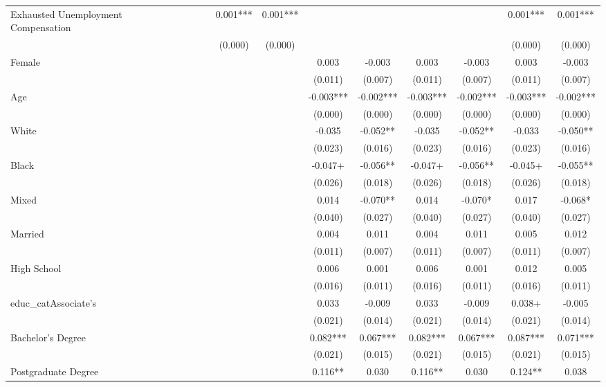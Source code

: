 \documentclass[
]{article}
\begin{document}
\begin{table}[t]
\begin{tabular*}{\linewidth}{@{\extracolsep{\fill}}lcccccccccccc}
Exhausted Unemployment Compensation &  &  &  &  & 0.001*** & 0.001*** &  &  &  &  & 0.001*** & 0.001*** \\ 
 &  &  &  &  & (0.000) & (0.000) &  &  &  &  & (0.000) & (0.000) \\ 
Female &  &  &  &  &  &  & 0.003 & -0.003 & 0.003 & -0.003 & 0.003 & -0.003 \\ 
 &  &  &  &  &  &  & (0.011) & (0.007) & (0.011) & (0.007) & (0.011) & (0.007) \\ 
Age &  &  &  &  &  &  & -0.003*** & -0.002*** & -0.003*** & -0.002*** & -0.003*** & -0.002*** \\ 
 &  &  &  &  &  &  & (0.000) & (0.000) & (0.000) & (0.000) & (0.000) & (0.000) \\ 
White &  &  &  &  &  &  & -0.035 & -0.052** & -0.035 & -0.052** & -0.033 & -0.050** \\ 
 &  &  &  &  &  &  & (0.023) & (0.016) & (0.023) & (0.016) & (0.023) & (0.016) \\ 
Black &  &  &  &  &  &  & -0.047+ & -0.056** & -0.047+ & -0.056** & -0.045+ & -0.055** \\ 
 &  &  &  &  &  &  & (0.026) & (0.018) & (0.026) & (0.018) & (0.026) & (0.018) \\ 
Mixed &  &  &  &  &  &  & 0.014 & -0.070** & 0.014 & -0.070* & 0.017 & -0.068* \\ 
 &  &  &  &  &  &  & (0.040) & (0.027) & (0.040) & (0.027) & (0.040) & (0.027) \\ 
Married &  &  &  &  &  &  & 0.004 & 0.011 & 0.004 & 0.011 & 0.005 & 0.012 \\ 
 &  &  &  &  &  &  & (0.011) & (0.007) & (0.011) & (0.007) & (0.011) & (0.007) \\ 
High School &  &  &  &  &  &  & 0.006 & 0.001 & 0.006 & 0.001 & 0.012 & 0.005 \\ 
 &  &  &  &  &  &  & (0.016) & (0.011) & (0.016) & (0.011) & (0.016) & (0.011) \\ 
educ\_catAssociate's &  &  &  &  &  &  & 0.033 & -0.009 & 0.033 & -0.009 & 0.038+ & -0.005 \\ 
 &  &  &  &  &  &  & (0.021) & (0.014) & (0.021) & (0.014) & (0.021) & (0.014) \\ 
Bachelor's Degree &  &  &  &  &  &  & 0.082*** & 0.067*** & 0.082*** & 0.067*** & 0.087*** & 0.071*** \\ 
 &  &  &  &  &  &  & (0.021) & (0.015) & (0.021) & (0.015) & (0.021) & (0.015) \\ 
Postgraduate Degree &  &  &  &  &  &  & 0.116** & 0.030 & 0.116** & 0.030 & 0.124** & 0.038 \\ 

\end{tabular*}
\end{table}
\end{document}
